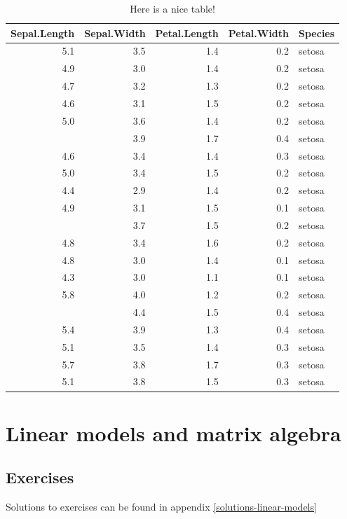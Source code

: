 \documentclass[]{book}
\theoremstyle{definition}
\theoremstyle{definition}
\theoremstyle{definition}
\theoremstyle{remark}
\begin{document}
\begin{table}

\caption{\label{tab:nice-tab}Here is a nice table!}
\centering
\begin{tabular}[t]{rrrrl}
\toprule
Sepal.Length & Sepal.Width & Petal.Length & Petal.Width & Species\\
\midrule
5.1 & 3.5 & 1.4 & 0.2 & setosa\\
4.9 & 3.0 & 1.4 & 0.2 & setosa\\
4.7 & 3.2 & 1.3 & 0.2 & setosa\\
4.6 & 3.1 & 1.5 & 0.2 & setosa\\
5.0 & 3.6 & 1.4 & 0.2 & setosa\\
\addlinespace
5.4 & 3.9 & 1.7 & 0.4 & setosa\\
4.6 & 3.4 & 1.4 & 0.3 & setosa\\
5.0 & 3.4 & 1.5 & 0.2 & setosa\\
4.4 & 2.9 & 1.4 & 0.2 & setosa\\
4.9 & 3.1 & 1.5 & 0.1 & setosa\\
\addlinespace
5.4 & 3.7 & 1.5 & 0.2 & setosa\\
4.8 & 3.4 & 1.6 & 0.2 & setosa\\
4.8 & 3.0 & 1.4 & 0.1 & setosa\\
4.3 & 3.0 & 1.1 & 0.1 & setosa\\
5.8 & 4.0 & 1.2 & 0.2 & setosa\\
\addlinespace
5.7 & 4.4 & 1.5 & 0.4 & setosa\\
5.4 & 3.9 & 1.3 & 0.4 & setosa\\
5.1 & 3.5 & 1.4 & 0.3 & setosa\\
5.7 & 3.8 & 1.7 & 0.3 & setosa\\
5.1 & 3.8 & 1.5 & 0.3 & setosa\\
\bottomrule
\end{tabular}
\end{table}

\chapter{Linear models and matrix algebra}\label{linear-models}

\section{Exercises}\label{exercises}

Solutions to exercises can be found in appendix
\ref{solutions-linear-models}
\end{document}
